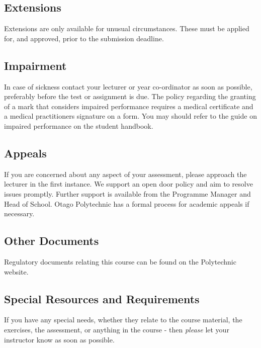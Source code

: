 \documentclass{article}
\begin{document}
\subsection*{Extensions}
Extensions are only available for unusual circumstances.  These must be applied for, and approved, prior to the submission deadline.

\subsection*{Impairment}
In case of sickness contact your lecturer or year co-ordinator as soon as possible, preferably before the test or
assignment is due.  The policy regarding the granting of a mark that considers impaired performance requires a medical
certificate and a medical practitioners signature on a form. You may should refer to the guide on impaired performance
on the student handbook.

\subsection*{Appeals}
If you are concerned about any aspect of your assessment, please approach the lecturer in the first instance.  We support
an open door policy and aim to resolve issues promptly.  Further support is available from the Programme
Manager and Head of School. Otago Polytechnic has a formal process for academic appeals if necessary.

\subsection*{Other Documents}
Regulatory documents relating this course can be found on the Polytechnic website.




\subsection*{Special Resources and Requirements}
If you have any special needs, whether they relate to the course material, the exercises, the assessment, or anything in the course -
then \textit{please} let your instructor know as soon as possible.
\end{document}
